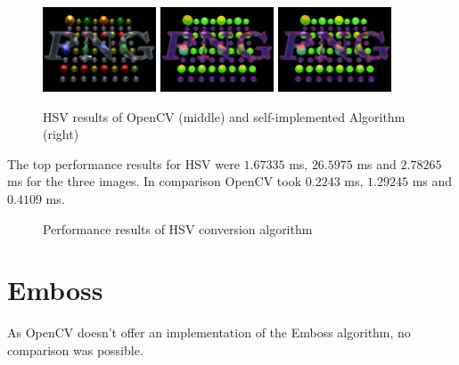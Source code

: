 \begin{figure}[H]
    \\
    \includegraphics[width=0.30\textwidth]{images/pnglogo-blk.png}
    \includegraphics[width=0.30\textwidth]{images/results/hsv-cv.pnglogo-blk.png}
    \includegraphics[width=0.30\textwidth]{images/results/hsv-my.pnglogo-blk.png}

    \begin{center}
        \caption{HSV results of OpenCV (middle) and self-implemented  Algorithm (right)}            
    \end{center}

    \label{fig:hsv1}
\end{figure}


The top performance results for HSV were $ 1.67335 $ ms, $ 26.5975 $ ms  and $ 2.78265 $ ms for the three images. In comparison OpenCV took $ 0.2243 $ ms, $ 1.29245 $ ms and $ 0.4109 $ ms.


\begin{center}
    \begin{figure}[H]
        \centering
        
        \caption{Performance results of HSV conversion algorithm}
    \end{figure}
\end{center}

\section{Emboss}

As OpenCV doesn't offer an implementation of the Emboss algorithm, no comparison was possible.

